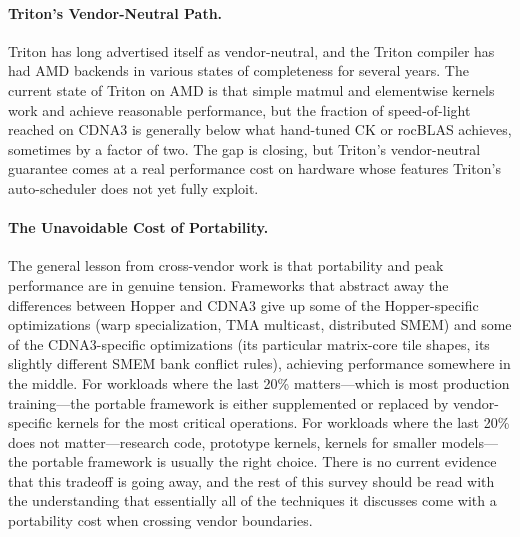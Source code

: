 \documentclass[10pt]{article}
\begin{document}
\paragraph{Triton's Vendor-Neutral Path.}
Triton \citep{tillet2019triton} has long advertised itself as vendor-neutral, and the Triton compiler has had AMD backends in various states of completeness for several years. The current state of Triton on AMD is that simple matmul and elementwise kernels work and achieve reasonable performance, but the fraction of speed-of-light reached on CDNA3 is generally below what hand-tuned CK or rocBLAS achieves, sometimes by a factor of two. The gap is closing, but Triton's vendor-neutral guarantee comes at a real performance cost on hardware whose features Triton's auto-scheduler does not yet fully exploit.

\paragraph{The Unavoidable Cost of Portability.}
The general lesson from cross-vendor work is that portability and peak performance are in genuine tension. Frameworks that abstract away the differences between Hopper and CDNA3 give up some of the Hopper-specific optimizations (warp specialization, TMA multicast, distributed SMEM) and some of the CDNA3-specific optimizations (its particular matrix-core tile shapes, its slightly different SMEM bank conflict rules), achieving performance somewhere in the middle. For workloads where the last 20\% matters---which is most production training---the portable framework is either supplemented or replaced by vendor-specific kernels for the most critical operations. For workloads where the last 20\% does not matter---research code, prototype kernels, kernels for smaller models---the portable framework is usually the right choice. There is no current evidence that this tradeoff is going away, and the rest of this survey should be read with the understanding that essentially all of the techniques it discusses come with a portability cost when crossing vendor boundaries.
\end{document}
